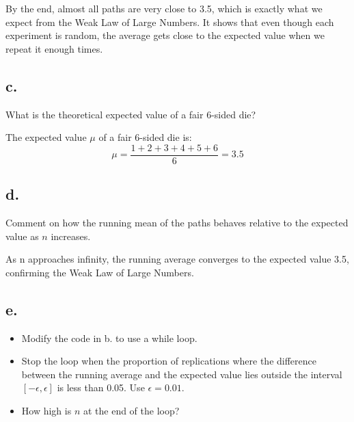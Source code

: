 \documentclass[
]{article}
\begin{document}
By the end, almost all paths are very close to 3.5, which is exactly
what we expect from the Weak Law of Large Numbers. It shows that even
though each experiment is random, the average gets close to the expected
value when we repeat it enough times.

\subsection{c.}\label{c.-2}

What is the theoretical expected value of a fair 6-sided die?

The expected value \(\mu\) of a fair 6-sided die is: \[
\mu = \frac{1 + 2 + 3 + 4 + 5 + 6}{6} = 3.5
\]

\subsection{d.~}\label{d.-1}

Comment on how the running mean of the paths behaves relative to the
expected value as \(n\) increases.

As n approaches infinity, the running average converges to the expected
value 3.5, confirming the Weak Law of Large Numbers.

\subsection{e.}\label{e.}

\begin{itemize}
\item
  Modify the code in b. to use a while loop.
\item
  Stop the loop when the proportion of replications where the difference
  between the running average and the expected value lies outside the
  interval \([-\epsilon,\epsilon]\) is less than 0.05. Use
  \(\epsilon = 0.01\).
\item
  How high is \(n\) at the end of the loop?
\end{itemize}
\end{document}
